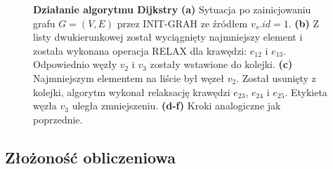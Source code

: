 \begin{figure}[!h]
\begin{subfigure}[b]{0.3\textwidth}
		\caption{}
	\end{subfigure}
	\caption{\textbf{Działanie algorytmu Dijkstry} \textbf{(a)} Sytuacja po zainicjowaniu grafu $G = \left( V, E \right)$ przez \textsf{INIT-GRAH} ze źródłem $v_{s}.id = 1$. \textbf{(b)} Z listy dwukierunkowej został wyciągnięty najmniejszy element i została wykonana operacja \textsc{RELAX} dla krawędzi: $e_{12}$ i $e_{13}$. Odpowiednio węzły $v_{2}$ i $v_{3}$ zostały wstawione do kolejki. \textbf{(c)} Najmniejszym elementem na liście był węzeł $v_{2}$. Został usunięty z kolejki, algorytm wykonał relaksację krawędzi $e_{23}$, $e_{24}$ i $e_{25}$. Etykieta węzła $v_{3}$ uległa zmniejszeniu. \textbf{(d-f)} Kroki analogiczne jak poprzednie.} \label{fig:exapleDijkstraDLList}
\end{figure}

\subsection{Złożoność obliczeniowa}

